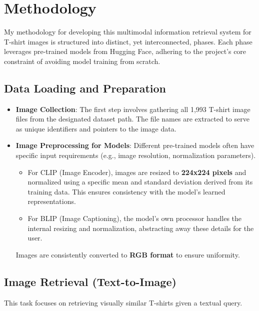\documentclass{article}
\begin{document}
\section{Methodology}
\label{sec:methodology}


My methodology for developing this multimodal information retrieval system for T-shirt images is structured into distinct, yet interconnected, phases. Each phase leverages pre-trained models from Hugging Face, adhering to the project's core constraint of avoiding model training from scratch.

\subsection{Data Loading and Preparation}
\begin{itemize}
    \item \textbf{Image Collection}: The first step involves gathering all 1,993 T-shirt image files from the designated dataset path. The file names are extracted to serve as unique identifiers and pointers to the image data.
    \item \textbf{Image Preprocessing for Models}: Different pre-trained models often have specific input requirements (e.g., image resolution, normalization parameters).
    \begin{itemize}
        \item For CLIP (Image Encoder), images are resized to \textbf{224x224 pixels} and normalized using a specific mean and standard deviation derived from its training data. This ensures consistency with the model's learned representations.
        \item For BLIP (Image Captioning), the model's own processor handles the internal resizing and normalization, abstracting away these details for the user.
    \end{itemize}
    Images are consistently converted to \textbf{RGB format} to ensure uniformity.
\end{itemize}

\subsection{Image Retrieval (Text-to-Image)}
This task focuses on retrieving visually similar T-shirts given a textual query.
\end{document}
